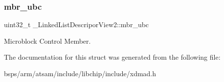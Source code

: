 \subsubsection{\texorpdfstring{mbr\_ubc}{mbr\_ubc}}
{\footnotesize\ttfamily uint32\+\_\+t \+\_\+\+Linked\+List\+Descripor\+View2\+::mbr\+\_\+ubc}

Microblock Control Member. 

The documentation for this struct was generated from the following file\+:\begin{DoxyCompactItemize}
\item 
bsps/arm/atsam/include/libchip/include/xdmad.\+h\end{DoxyCompactItemize}
